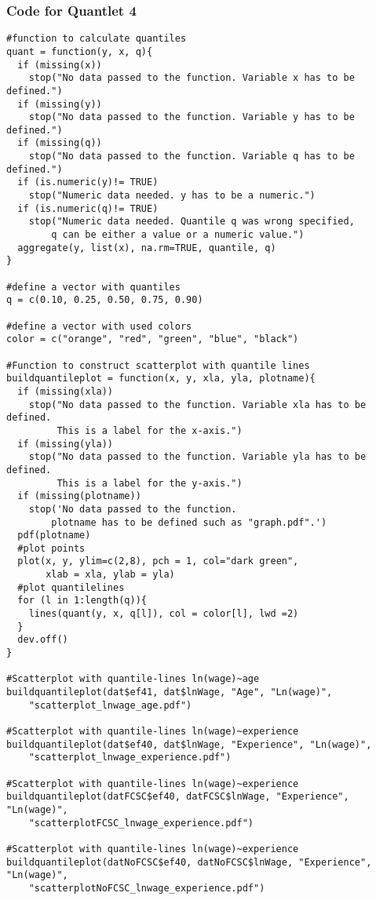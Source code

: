 \subsubsection{Code for Quantlet 4}
\lstset{firstnumber = 254}
\begin{lstlisting}
#function to calculate quantiles
quant = function(y, x, q){
  if (missing(x))
    stop("No data passed to the function. Variable x has to be defined.")
  if (missing(y))
    stop("No data passed to the function. Variable y has to be defined.")
  if (missing(q))
    stop("No data passed to the function. Variable q has to be defined.")
  if (is.numeric(y)!= TRUE)
    stop("Numeric data needed. y has to be a numeric.")
  if (is.numeric(q)!= TRUE)
    stop("Numeric data needed. Quantile q was wrong specified, 
    	q can be either a value or a numeric value.")
  aggregate(y, list(x), na.rm=TRUE, quantile, q)
}

#define a vector with quantiles
q = c(0.10, 0.25, 0.50, 0.75, 0.90) 

#define a vector with used colors
color = c("orange", "red", "green", "blue", "black")

#Function to construct scatterplot with quantile lines
buildquantileplot = function(x, y, xla, yla, plotname){
  if (missing(xla))
    stop("No data passed to the function. Variable xla has to be defined.
         This is a label for the x-axis.")
  if (missing(yla))
    stop("No data passed to the function. Variable yla has to be defined.
         This is a label for the y-axis.")
  if (missing(plotname))
    stop('No data passed to the function.
    	plotname has to be defined such as "graph.pdf".') 
  pdf(plotname)
  #plot points
  plot(x, y, ylim=c(2,8), pch = 1, col="dark green", 
       xlab = xla, ylab = yla)
  #plot quantilelines
  for (l in 1:length(q)){
    lines(quant(y, x, q[l]), col = color[l], lwd =2)
  }
  dev.off()
}

#Scatterplot with quantile-lines ln(wage)~age
buildquantileplot(dat$ef41, dat$lnWage, "Age", "Ln(wage)", 
	"scatterplot_lnwage_age.pdf")

#Scatterplot with quantile-lines ln(wage)~experience
buildquantileplot(dat$ef40, dat$lnWage, "Experience", "Ln(wage)", 
	"scatterplot_lnwage_experience.pdf")

#Scatterplot with quantile-lines ln(wage)~experience
buildquantileplot(datFCSC$ef40, datFCSC$lnWage, "Experience", "Ln(wage)",
	"scatterplotFCSC_lnwage_experience.pdf")

#Scatterplot with quantile-lines ln(wage)~experience
buildquantileplot(datNoFCSC$ef40, datNoFCSC$lnWage, "Experience", "Ln(wage)",
	"scatterplotNoFCSC_lnwage_experience.pdf")

\end{lstlisting}

